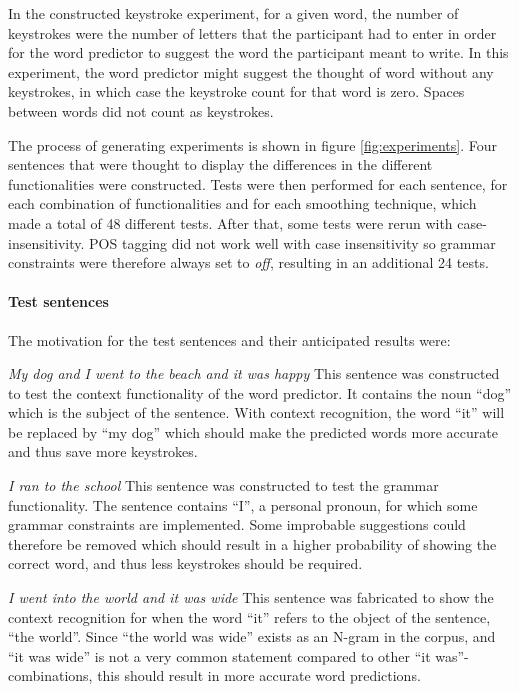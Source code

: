 In the constructed keystroke experiment, for a given word, the number of keystrokes were the number of letters that the participant had to enter in order for the word predictor to suggest the word the participant meant to write. In this experiment, the word predictor might suggest the thought of word without any keystrokes, in which case the keystroke count for that word is zero. Spaces between words did not count as keystrokes.

The process of generating experiments is shown in figure \ref{fig:experiments}. Four sentences that were thought to display the differences in the different functionalities were constructed. Tests were then performed for each sentence, for each combination of functionalities and for each smoothing technique, which made a total of 48 different tests. After that, some tests were rerun with case-insensitivity. POS tagging did not work well with case insensitivity so grammar constraints were therefore always set to \emph{off}, resulting in an additional 24 tests.

\paragraph{Test sentences}
The motivation for the test sentences and their anticipated results were:

\emph{My dog and I went to the beach and it was happy}
This sentence was constructed to test the context functionality of the word predictor. It contains the noun “dog” which is the subject of the sentence. With context recognition, the word “it” will be replaced by “my dog” which should make the predicted words more accurate and thus save more keystrokes.

\emph{I ran to the school}
This sentence was constructed to test the grammar functionality. The sentence contains “I”, a personal pronoun, for which some grammar constraints are implemented. Some improbable suggestions could therefore be removed which should result in a higher probability of showing the correct word, and thus less keystrokes should be required.

\emph{I went into the world and it was wide}
This sentence was fabricated to show the context recognition for when the word “it” refers to the object of the sentence, “the world”. Since “the world was wide” exists as an N-gram in the corpus, and “it was wide” is not a very common statement compared to other “it was”-combinations, this should result in more accurate word predictions.

